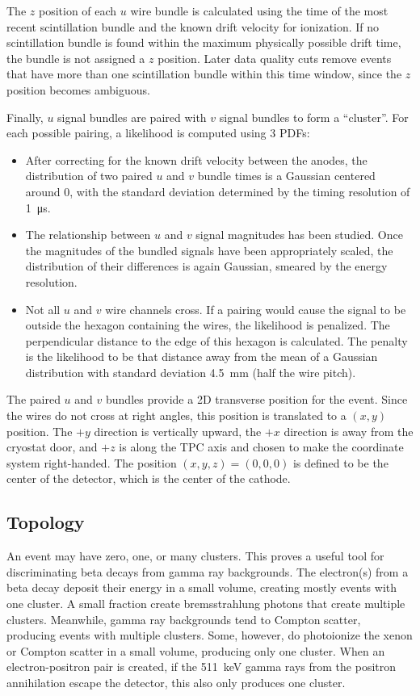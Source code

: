 \documentclass[herrin-thesis.tex]{subfiles}
\begin{document}
The \(z\) position of each \(u\) wire bundle is calculated using the time of the most recent scintillation bundle and the known drift velocity for ionization. If no scintillation bundle is found within the maximum physically possible drift time, the bundle is not assigned a \(z\) position. Later data quality cuts remove events that have more than one scintillation bundle within this time window, since the \(z\) position becomes ambiguous.

Finally, \(u\) signal bundles are paired with \(v\) signal bundles to form a ``cluster''. For each possible pairing, a likelihood is computed using 3 PDFs:
\begin{itemize}
\item After correcting for the known drift velocity between the anodes, the distribution of two paired \(u\) and \(v\) bundle times is a Gaussian centered around 0, with the standard deviation determined by the timing resolution of \SI{1}{\micro\s}.
\item The relationship between \(u\) and \(v\) signal magnitudes has been studied. Once the magnitudes of the bundled signals have been appropriately scaled, the distribution of their differences is again Gaussian, smeared by the energy resolution.
\item Not all \(u\) and \(v\) wire channels cross. If a pairing would cause the signal to be outside the hexagon containing the wires, the likelihood is penalized. The perpendicular distance to the edge of this hexagon is calculated. The penalty is the likelihood to be that distance away from the mean of a Gaussian distribution with standard deviation \SI{4.5}{\mm} (half the wire pitch).
\end{itemize}

The paired \(u\) and \(v\) bundles provide a 2D transverse position for the event. Since the wires do not cross at right angles, this position is translated to a \((x, y)\) position. The \(+y\) direction is vertically upward, the \(+x\) direction is away from the cryostat door, and \(+z\) is along the TPC axis and chosen to make the coordinate system right-handed. The position \((x, y, z) = (0, 0, 0)\) is defined to be the center of the detector, which is the center of the cathode.

\subsection{Topology}
\label{sec:data_topology}
An event may have zero, one, or many clusters. This proves a useful tool for discriminating beta decays from gamma ray backgrounds. The electron(s) from a beta decay deposit their energy in a small volume, creating mostly events with one cluster. A small fraction create bremsstrahlung photons that create multiple clusters. Meanwhile, gamma ray backgrounds tend to Compton scatter, producing events with multiple clusters. Some, however, do photoionize the xenon or Compton scatter in a small volume, producing only one cluster. When an electron-positron pair is created, if the \SI{511}{\keV} gamma rays from the positron annihilation escape the detector, this also only produces one cluster.
\end{document}
